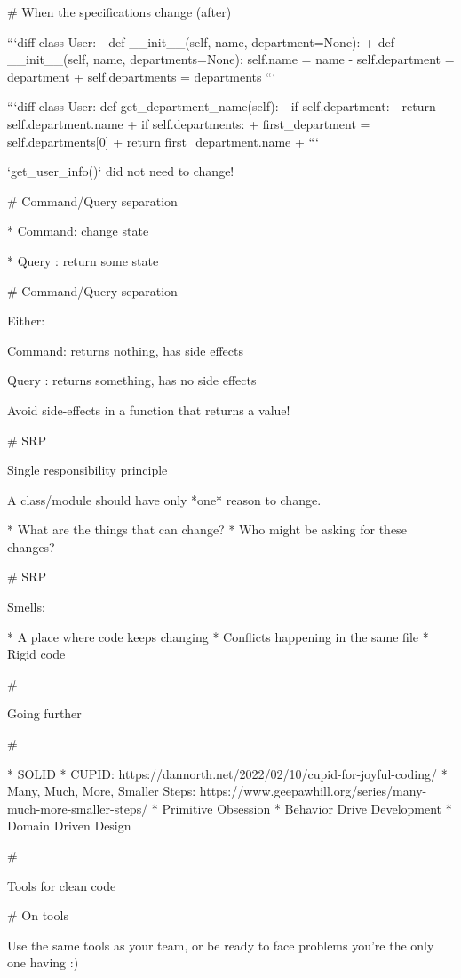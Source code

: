 # When the specifications change (after)


```diff
class User:
- def __init__(self, name, department=None):
+ def __init__(self, name, departments=None):
        self.name = name
-        self.department = department
+        self.departments = departments
```

```diff
class User:
   def get_department_name(self):
-       if self.department:
-           return self.department.name
+       if self.departments:
+           first_department = self.departments[0]
+           return first_department.name
+
```

`get_user_info()` did not need to change!

# Command/Query separation

* Command: change state

* Query : return some state

# Command/Query separation

Either:

Command: returns nothing, has side effects

Query : returns something, has no side effects

\vfill

Avoid side-effects in a function that returns a value!

# SRP

Single responsibility principle

A class/module should have only *one* reason to change.

* What are the things that can change?
* Who might be asking for these changes?

# SRP

Smells:

* A place where code keeps changing
* Conflicts happening in the same file
* Rigid code

#

\huge \center Going further

#

* SOLID
* CUPID: https://dannorth.net/2022/02/10/cupid-for-joyful-coding/
* Many, Much, More, Smaller Steps: https://www.geepawhill.org/series/many-much-more-smaller-steps/
* Primitive Obsession
* Behavior Drive Development
* Domain Driven Design

#

\huge \center Tools for clean code

# On tools

Use the same tools as your team, or be ready to face
problems you're the only one having :)

